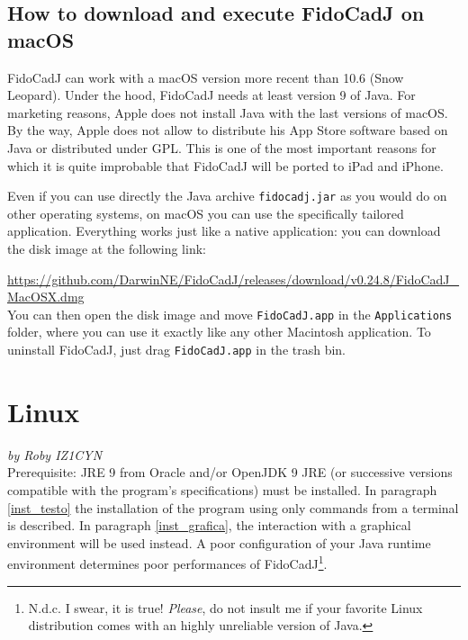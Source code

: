 \documentclass[10pt,a4paper,twoside]{scrreprt}
\begin{document}
\subsection{How to download and execute FidoCadJ on macOS}
FidoCadJ can work with a macOS version more recent than 10.6 (Snow Leopard).
Under the hood, FidoCadJ needs at least version 9 of Java. For marketing reasons, Apple does not install Java with the last versions of macOS. By the way, Apple does not allow to distribute his App Store software based on Java or distributed under GPL. This is one of the most important reasons for which it is quite improbable that FidoCadJ will be ported to iPad and iPhone.

Even if you can use directly the Java archive \lstinline!fidocadj.jar! as you would do on other operating systems, on macOS you can use the specifically tailored application. Everything works just like a native application: you can download the disk image at the following link:

{\footnotesize
\href{https://github.com/DarwinNE/FidoCadJ/releases/download/v0.24.8/FidoCadJ_MacOSX.dmg}{https://github.com/DarwinNE/FidoCadJ/releases/download/v0.24.8/FidoCadJ\_MacOSX.dmg}}\\
You can then open the disk image and move \lstinline!FidoCadJ.app! in the \lstinline!Applications! folder, where you can use it exactly like any other Macintosh application. To uninstall FidoCadJ, just drag  \lstinline!FidoCadJ.app! in the trash bin.


\section{Linux}
\label{installazione_linux} \textsl{by Roby IZ1CYN}\\


Prerequisite: JRE 9 from Oracle and/or OpenJDK
9 JRE (or successive versions compatible with the program's
specifications) must be installed. In paragraph \ref{inst_testo}
the installation of the program using only commands from a terminal
is described. In paragraph \ref{inst_grafica}, the interaction
with a graphical environment will be used instead. A poor configuration of your Java runtime environment determines poor performances of FidoCadJ\footnote{N.d.c. I swear, it is true! \textit{Please}, do not insult me if your favorite Linux distribution comes with an highly unreliable version of Java.}.
\end{document}
